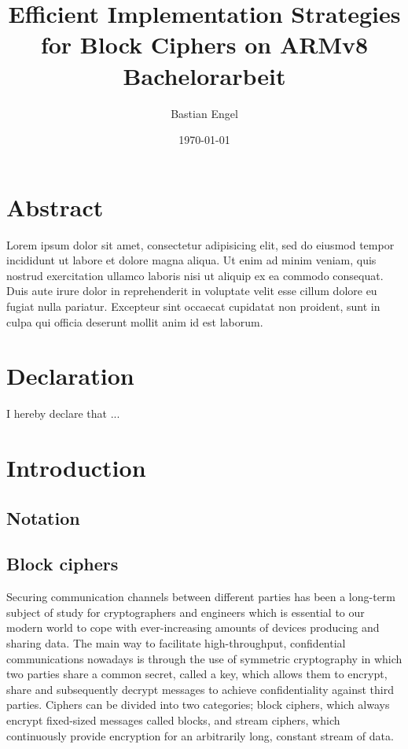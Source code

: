 \documentclass[12pt]{report}
\title{
    \textbf{Efficient Implementation Strategies for Block Ciphers on ARMv8}\\
    {\footnotesize Bachelorarbeit}
}
\author{Bastian Engel}
\date{\today}
\begin{document}
\maketitle

\chapter*{Abstract}

Lorem ipsum dolor \cite{gift:2017} sit amet, consectetur adipisicing elit, sed do eiusmod tempor
incididunt ut labore et dolore magna aliqua. Ut enim ad minim veniam, quis
nostrud exercitation ullamco laboris nisi ut aliquip ex ea commodo consequat.
Duis aute irure dolor in reprehenderit in voluptate velit esse cillum dolore eu
fugiat nulla pariatur. Excepteur sint occaecat cupidatat non proident, sunt in
culpa qui officia deserunt mollit anim id est laborum.

\chapter*{Declaration}

I hereby declare that ...

\tableofcontents

\chapter{Introduction}
\section{Notation}

\section{Block ciphers}

Securing communication channels between different parties has been a long-term
subject of study for cryptographers and engineers which is essential to our
modern world to cope with ever-increasing amounts of devices producing and
sharing data. The main way to facilitate high-throughput, confidential
communications nowadays is through the use of symmetric cryptography in which
two parties share a common secret, called a key, which allows them to encrypt,
share and subsequently decrypt messages to achieve confidentiality against
third parties. Ciphers can be divided into two categories; block ciphers, which
always encrypt fixed-sized messages called blocks, and stream ciphers, which
continuously provide encryption for an arbitrarily long, constant stream of
data.
\end{document}
